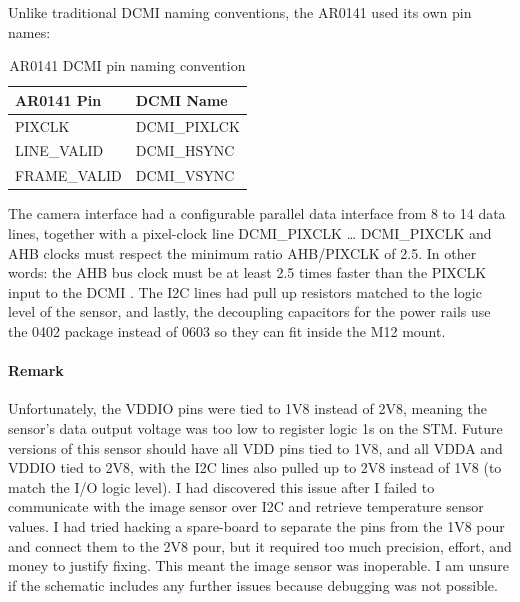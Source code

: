 \nl
Unlike traditional DCMI naming conventions, the AR0141 used its own pin names:
\begin{table}[H]
    \centering
    \begin{tabular}{|l|l|}
        \hline
        \textbf{AR0141 Pin} & \textbf{DCMI Name} \\
        \hline
        PIXCLK & DCMI\_PIXLCK \\
        \hline
        LINE\_VALID & DCMI\_HSYNC \\
        \hline
        FRAME\_VALID & DCMI\_VSYNC \\
        \hline
    \end{tabular}
    \caption{AR0141 DCMI pin naming convention}
\end{table}

The camera interface had a configurable parallel data interface from 8 to 14 data lines, together with a pixel-clock line DCMI\_PIXCLK … DCMI\_PIXCLK and AHB clocks must respect the minimum ratio AHB/PIXCLK of 2.5. In other words: the AHB bus clock must be at least 2.5 times faster than the PIXCLK input to the DCMI \cite{ST_STM32F7_Peripheral_DCMI}.
\nl
The I2C lines had pull up resistors matched to the logic level of the sensor, and lastly, the decoupling capacitors for the power rails use the 0402 package instead of 0603 so they can fit inside the M12 mount.

\paragraph{Remark}
Unfortunately, the VDDIO pins were tied to 1V8 instead of 2V8, meaning the sensor's data output voltage was too low to register logic 1s on the STM. Future versions of this sensor should have all VDD pins tied to 1V8, and all VDDA and VDDIO tied to 2V8, with the I2C lines also pulled up to 2V8 instead of 1V8 (to match the I/O logic level). I had discovered this issue after I failed to communicate with the image sensor over I2C and retrieve temperature sensor values. I had tried hacking a spare-board to separate the pins from the 1V8 pour and connect them to the 2V8 pour, but it required too much precision, effort, and money to justify fixing. This meant the image sensor was inoperable. I am unsure if the schematic includes any further issues because debugging was not possible.